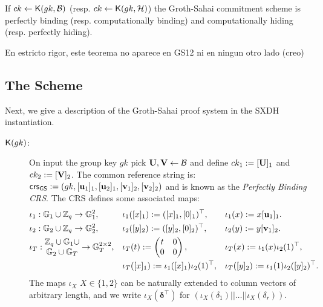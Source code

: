 \begin{theorem} If $ck\gets\mathsf{K}(gk,\mathcal{B})$ (resp. $ck\gets\mathsf{K}(gk,\mathcal{H})$) the Groth-Sahai commitment scheme is perfectly binding (resp. computationally binding) and computationally hiding (resp. perfectly hiding).

{\color{red} En estricto rigor, este teorema no aparece en GS12 ni en ningun otro lado (creo)}
\end{theorem}

\subsection{The Scheme}
Next, we give a description of the Groth-Sahai proof system in the SXDH instantiation.
\begin{description}
\item[$\mathsf{K}(gk)$:]  On input the group key $gk$ pick $\mathbf{{U}},\mathbf{{V}}\gets\mathcal{B}$ and define $ck_1 := [\mathbf{{U}}]_1$ and $ck_2:=[\mathbf{{V}}]_2$.
   The common reference string is:
   $\mathsf{crs}_{\mathsf{GS}}:=(gk,[\mathbf{u}_1]_1,[\mathbf{u}_2]_1,[\mathbf{v}_1]_2,[\mathbf{v}_2]_2)$ and is known as the \emph{Perfectly Binding CRS}.
The CRS defines some associated maps:
\begin{align*}
&\iota_1: \mathbb{G}_1 \cup \mathbb{Z}_q \rightarrow \mathbb{G}_1^2,& &\iota_1([x]_1):=([x]_1,[0]_1)^\top,& &\iota_1(x):=x[\mathbf{u}_1]_1. \\
&\iota_2: \mathbb{G}_2 \cup \mathbb{Z}_q \rightarrow \mathbb{G}_2^2,& &\iota_2([y]_2):=([y]_2,[0]_2)^\top,& &\iota_2(y):=y[\mathbf{v}_1]_2.\\
&\iota_T: \begin{matrix}\mathbb{Z}_q\cup\mathbb{G}_1\cup\\\mathbb{G}_2\cup\mathbb{G}_T\end{matrix} \rightarrow \mathbb{G}_T^{2\times2}, &
    &\iota_T(t):=\left(\begin{matrix}t & 0 \\ 0 & 0\end{matrix}\right),& & \iota_T(x) := \iota_1(x)\iota_2(1)^\top,\\
&                                       & &\iota_T([x]_1):=\iota_1([x]_1)\iota_2(1)^\top,& &\iota_T([y]_2) := \iota_1(1)\iota_2([y]_2)^\top.
\end{align*}
The maps $\iota_X$ $X \in \{1,2\}$ can be naturally extended to column vectors of arbitrary length, and we write $\iota_X(\boldsymbol \delta^{\top})$ for 
$(\iota_X(\delta_1)|| \ldots ||\iota_X(\delta_r))$.


\end{description}
